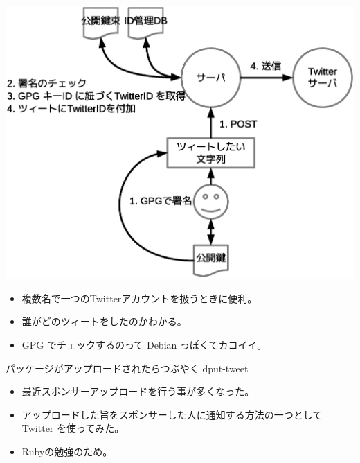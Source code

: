 \begin{frame}

\begin{center}
\includegraphics[width=1.0\hsize]{image201201/debianmeeting201201-imagedata-twgw.eps}
\end{center}

%

\end{frame}

\begin{frame}{}

\begin{itemize}
\item 複数名で一つのTwitterアカウントを扱うときに便利。
\item 誰がどのツィートをしたのかわかる。
\item GPG でチェックするのって Debian っぽくてカコイイ。
\end{itemize}
\end{frame}

\begin{frame}{パッケージがアップロードされたらつぶやく dput-tweet}

\begin{itemize}
\item 最近スポンサーアップロードを行う事が多くなった。
\item アップロードした旨をスポンサーした人に通知する方法の一つとして Twitter を使ってみた。
\item Rubyの勉強のため。
\end{itemize}

\end{frame}


